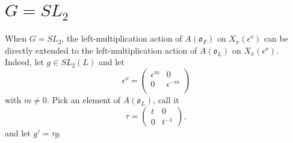 \documentclass{amsart}
\theoremstyle{definition}
\def\O{\mathfrak{o}}
\def\e{\epsilon}
\def\A{A(\O_F)}
\def\en{\e^{\nu}}
\def\X{X_x(\en)}
\begin{document}
  \section{$G = SL_2$}
  \label{chap:SL_2}
  When $G = SL_2$, the left-multiplication action of $\A$ on $\X$ can be
  directly extended to the left-multiplication action of $A(\O_L)$ on $\X$.
  Indeed, let $g \in SL_2(L)$ and let
  \begin{equation*}
    \en = \begin{pmatrix}
      \e^{m} & 0 \\
      0 & \e^{-m} \\
    \end{pmatrix} 
  \end{equation*}
  with $m \neq 0$.  Pick an element of $A(\O_L)$, call it
  \begin{equation*}
    \tau = \begin{pmatrix}
      t & 0 \\
      0 & t^{-1}
    \end{pmatrix},
  \end{equation*}
  and let $g' = \tau g$.
\end{document}
